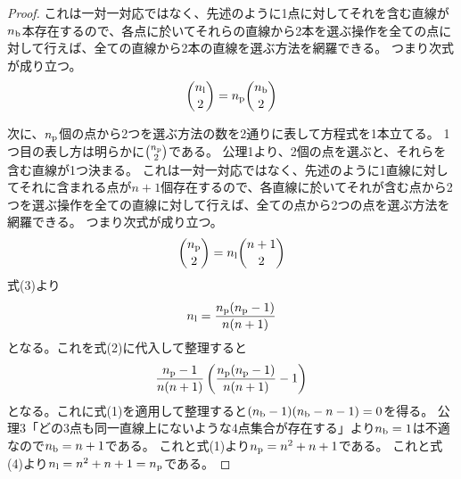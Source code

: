 \begin{proof}
                これは一対一対応ではなく、先述のように1点に対してそれを含む直線が$n_\textrm{b}$本存在するので、各点に於いてそれらの直線から2本を選ぶ操作を全ての点に対して行えば、全ての直線から2本の直線を選ぶ方法を網羅できる。
                つまり次式が成り立つ。
                \begin{equation}
                    \binom{n_\textrm{l}}{2} = n_\textrm{p}\binom{n_\textrm{b}}{2}
                \end{equation}
                \par
                次に、$n_\textrm{p}$個の点から2つを選ぶ方法の数を2通りに表して方程式を1本立てる。
                1つ目の表し方は明らかに$\binom{n_\textrm{p}}{2}$である。
                公理1より、2個の点を選ぶと、それらを含む直線が1つ決まる。
                これは一対一対応ではなく、先述のように1直線に対してそれに含まれる点が$n+1$個存在するので、各直線に於いてそれが含む点から2つを選ぶ操作を全ての直線に対して行えば、全ての点から2つの点を選ぶ方法を網羅できる。
                つまり次式が成り立つ。
                \begin{equation}
                    \binom{n_\textrm{p}}{2} = n_\textrm{l}\binom{n+1}{2}
                \end{equation}
                式(3)より
                \begin{equation}
                    n_\textrm{l} = \frac{n_\textrm{p}(n_\textrm{p}-1)}{n(n+1)}
                \end{equation}
                となる。これを式(2)に代入して整理すると
                \[ \frac{n_\textrm{p}-1}{n(n+1)}\left(\frac{n_\textrm{p}(n_\textrm{p}-1)}{n(n+1)} - 1\right) \]
                となる。これに式(1)を適用して整理すると$(n_\textrm{b}-1)(n_\textrm{b}-n-1) = 0$を得る。
                公理3「どの3点も同一直線上にないような4点集合が存在する」より$n_\textrm{b}=1$は不適なので$n_\textrm{b}=n+1$である。
                これと式(1)より$n_\textrm{p} = n^2+n+1$である。
                これと式(4)より$n_\textrm{l} = n^2+n+1 = n_\textrm{p}$である。
            \end{proof}